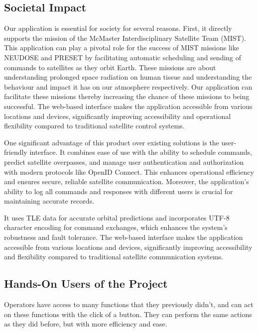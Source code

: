 \documentclass[12pt]{article}
\begin{document}
\subsection{Societal Impact}
Our application is essential for society for several reasons. First, it directly supports the mission of the McMaster Interdisciplinary Satellite Team (MIST). This application can play a pivotal role for the success of MIST missions like NEUDOSE and PRESET by facilitating automatic scheduling and sending of commands to satellites as they orbit Earth. These missions are about understanding prolonged space radiation on human tissue and understanding the behaviour and impact it has on our atmosphere respectively. Our application can facilitate these missions thereby increasing the chance of these missions to being successful. The web-based interface makes the application accessible from various locations and devices, significantly improving accessibility and operational flexibility compared to traditional satellite control systems.

One significant advantage of this product over existing solutions is the user-friendly interface. It combines ease of use with the ability to schedule commands, predict satellite overpasses, and manage user authentication and authorization with modern protocols like OpenID Connect. This enhances operational efficiency and ensures secure, reliable satellite communication. Moreover, the application’s ability to log all commands and responses with different users is crucial for maintaining accurate records. 

It uses TLE data for accurate orbital predictions and incorporates UTF-8 character encoding for command exchanges, which enhances the system's robustness and fault tolerance. The web-based interface makes the application accessible from various locations and devices, significantly improving accessibility and flexibility compared to traditional satellite communication systems.


\subsection{Hands-On Users of the Project}
Operators have access to many functions that they previously didn't, and can act on these functions with the click of a button. They can perform the same actions as they did before, but with more efficiency and ease. 
\end{document}
